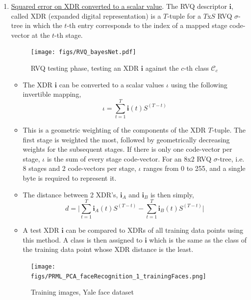 \begin{enumerate}
\item \underline{Squared error on XDR converted to a scalar value}.  The RVQ descriptor $\mathbf{i}$, called XDR (expanded digital representation) \cite{2007_JNL_IDDM_Barnes} is a $T$-tuple for a $T$x$S$ RVQ $\sigma$-tree in which the $t$-th entry corresponds to the index of a mapped stage code-vector at the $t$-th stage.  
							\begin{figure}[t]
							\centering
							\texttt{[image: figs/RVQ\_bayesNet.pdf]}
							\caption{RVQ testing phase, testing an XDR $\mathbf{i}$ against the $c$-th class $\mathcal{C}_c$}
							\label{fig:RVQ_bayesNet.pdf}
							\end{figure}




	\begin{itemize}
		\item The XDR $\mathbf{i}$ can be converted to a scalar values $\iota$ using the following invertible mapping,
\begin{equation}
\iota=\sum\limits_{t=1}^{T}\mathbf{i}(t)S^{(T-t)}
\end{equation}
		\item This is a geometric weighting of the components of the XDR $T$-tuple.  The first stage is weighted the most, followed by geometrically decreasing weights for the subsequent stages.  If there is only one code-vector per stage, $\iota$ is the sum of every stage code-vector.  For an 8x2 RVQ $\sigma$-tree, i.e. 8 stages and 2 code-vectors per stage, $\iota$ ranges from 0 to 255, and a single byte is required to represent it.
		\item The distance between 2 XDR's, $\mathbf{i}_A$ and $\mathbf{i}_B$ is then simply, 
\begin{equation}
d = \bigg|\sum\limits_{t=1}^{T}\mathbf{i}_A(t)S^{(T-t)} - \sum\limits_{t=1}^{T}\mathbf{i}_B(t)S^{(T-t)}\bigg|
\end{equation}
	\item A test XDR $\mathbf{i}$ can be compared to XDRs of all training data points using this method.  A class is then assigned to $\mathbf{i}$ which is the same as the class of the training data point whose XDR distance is the least.
	\end{itemize}

								\begin{figure}[t]
								\texttt{[image: figs/PRML\_PCA\_faceRecognition\_1\_trainingFaces.png]}
								\caption{Training images, Yale face dataset}
								\label{fig:dataset_Yale}
								\end{figure}


\end{enumerate}
